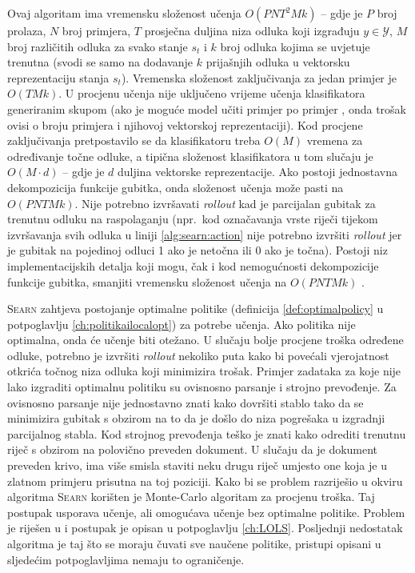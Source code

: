 Ovaj algoritam ima vremensku složenost učenja $O(P N T^2 M k)$ -- gdje je $P$
broj prolaza, $N$ broj primjera, $T$ prosječna duljina niza odluka koji
izgrađuju $y \in \mathcal{Y}$, $M$ broj različitih odluka za svako stanje $s_t$
i $k$ broj odluka kojima se uvjetuje trenutna (svodi se samo na dodavanje $k$
prijašnjih odluka u vektorsku reprezentaciju stanja $s_t$). Vremenska složenost
zaključivanja za jedan primjer je $O(T M k)$. U procjenu učenja nije uključeno
vrijeme učenja klasifikatora generiranim skupom (ako je moguće model učiti
primjer po primjer , onda trošak ovisi o broju primjera i njihovoj
vektorskoj reprezentaciji). Kod procjene zaključivanja pretpostavilo se da
klasifikatoru treba $O(M)$ vremena za određivanje točne odluke, a tipična
složenost klasifikatora u tom slučaju je $O(M \cdot d)$ -- gdje je $d$ duljina
vektorske reprezentacije. Ako postoji jednostavna dekompozicija funkcije
gubitka, onda složenost učenja može pasti na $O(P N T M k)$. Nije potrebno
izvršavati \textit{rollout} kad je parcijalan gubitak za trenutnu odluku na
raspolaganju (npr.~kod označavanja vrste riječi tijekom izvršavanja svih odluka
u liniji \ref{alg:searn:action} nije potrebno izvršiti \textit{rollout} jer je
gubitak na pojedinoj odluci 1 ako je netočna ili 0 ako je točna). Postoji niz
implementacijskih detalja koji mogu, čak i kod nemogućnosti dekompozicije
funkcije gubitka, smanjiti vremensku složenost učenja na $O(P N T M k)$
\citep{daume14lts}.

\textsc{Searn} zahtjeva postojanje optimalne politike (definicija
\ref{def:optimalpolicy} u potpoglavlju \ref{ch:politikailocalopt}) za potrebe
učenja. Ako politika nije optimalna, onda će učenje biti otežano. U slučaju bolje
procjene troška određene odluke, potrebno je izvršiti \textit{rollout} nekoliko
puta kako bi povećali vjerojatnost otkrića
točnog niza odluka koji minimizira trošak. Primjer zadataka za koje nije lako
izgraditi optimalnu politiku su ovisnosno parsanje i strojno prevođenje. Za
ovisnosno parsanje nije jednostavno znati kako dovršiti stablo tako da se
minimizira gubitak s obzirom na to da je došlo do niza pogrešaka u izgradnji
parcijalnog stabla. Kod strojnog prevođenja teško je znati kako odrediti
trenutnu riječ s obzirom na polovično preveden dokument. U slučaju da je
dokument preveden krivo, ima više smisla staviti neku drugu riječ umjesto
one koja je u zlatnom primjeru prisutna na toj poziciji. Kako bi se problem
razriješio u okviru algoritma \textsc{Searn} korišten je Monte-Carlo algoritam
za procjenu troška. Taj postupak usporava učenje, ali omogućava učenje bez
optimalne politike. Problem je riješen u \citep{daume15lols} i postupak je opisan
u potpoglavlju \ref{ch:LOLS}. Posljednji nedostatak algoritma je taj što se
moraju čuvati sve naučene politike, pristupi opisani u sljedećim potpoglavljima
nemaju to ograničenje.

